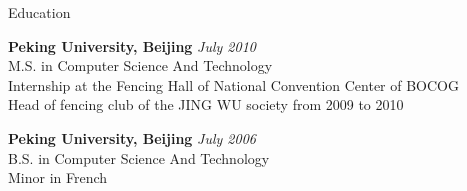 \documentclass{resume} %
\begin{document}

\begin{rSection}{Education}

{\bf Peking University, Beijing} \hfill {\em July 2010} \\ 
M.S. in Computer Science And Technology \\
Internship at the Fencing Hall of National Convention Center of BOCOG \\
Head of fencing club of the JING WU society from 2009 to 2010 

{\bf Peking University, Beijing} \hfill {\em July 2006} \\ 
B.S. in Computer Science And Technology \\
Minor in French

\end{rSection}






\end{document}
